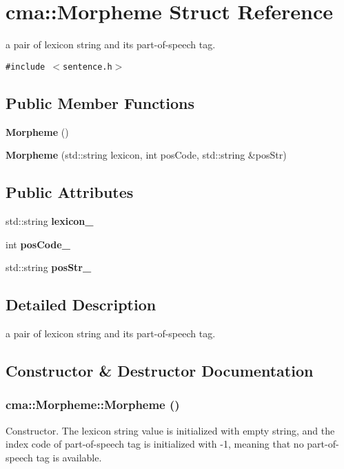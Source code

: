 \section{cma::Morpheme Struct Reference}
\label{structcma_1_1Morpheme}
a pair of lexicon string and its part-of-speech tag.  


{\tt \#include $<$sentence.h$>$}

\subsection*{Public Member Functions}
\begin{CompactItemize}
\item 
{\bf Morpheme} ()
\item 
{\bf Morpheme} (std::string lexicon, int posCode, std::string \&posStr)
\end{CompactItemize}
\subsection*{Public Attributes}
\begin{CompactItemize}
\item 
std::string {\bf lexicon\_\-}
\item 
int {\bf posCode\_\-}
\item 
std::string {\bf posStr\_\-}
\end{CompactItemize}


\subsection{Detailed Description}
a pair of lexicon string and its part-of-speech tag. 

\subsection{Constructor \& Destructor Documentation}
\subsubsection[{Morpheme}]{\setlength{\rightskip}{0pt plus 5cm}cma::Morpheme::Morpheme ()}\label{structcma_1_1Morpheme_79ab5404cd959f89daadb8a7714334cb}


Constructor. The lexicon string value is initialized with empty string, and the index code of part-of-speech tag is initialized with -1, meaning that no part-of-speech tag is available. 

